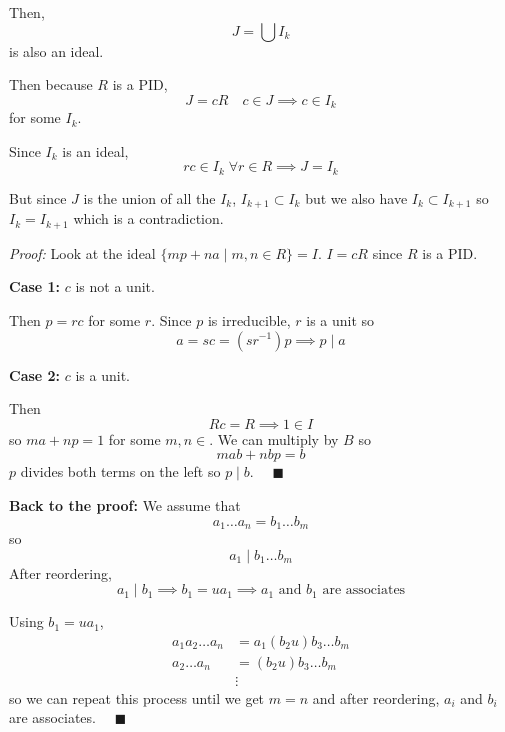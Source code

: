 \documentclass[12pt]{report}
\newcommand{\qed}{\quad \blacksquare}
\newenvironment*{tbox}[3][breakable]{
    \begin{tcolorbox}[
        parbox=false,
        colback=#2!5!white,
        colframe=#2!75!black,
        title={#3},
        #1
    ]}
    {\end{tcolorbox}}
\begin{document}
\begin{tbox}{gray}{\textbf{Theorem}: If a ring is a PID, it is a UFD}
            Then, 
            \[J = \bigcup I_k\] 
            is also an ideal. 
            
            Then because $R$ is a PID, 
            \[J = cR \quad c \in J \implies c \in I_k\]
            for some $I_k$. 
            
            Since $I_k$ is an ideal, 
            \[rc \in I_k \; \forall r \in R \implies J = I_k\]

            But since $J$ is the union of all the $I_k$, $I_{k+1} \subset I_k$ but we also have $I_k \subset I_{k+1}$ so $I_k = I_{k+1}$ which is a contradiction.

            
            \begin{tcolorbox}[colback=gray!5!white,colframe=gray!75!black,
                title={\emph{Lemma:} In a PID, if $p$ irreducible and $p \mid ab$, then $p \mid a$ or $p \mid b$}]

                \emph{Proof:} Look at the ideal $\{mp + na \; | \; m, n \in R\} = I$. $I = cR$ since $R$ is a PID. 

                \textbf{Case 1:} $c$ is not a unit. 
                
                Then $p = rc$ for some $r$. Since $p$ is irreducible, $r$ is a unit so 
                \[a = sc = (sr^{-1})p \implies p \mid a\]

                \textbf{Case 2:} $c$ is a unit. 

                Then 
                \[Rc = R \implies 1 \in I\] 
                so $ma + np = 1$ for some $m, n \in $. We can multiply by $B$ so 
                \[mab + nbp = b\]
                $p$ divides both terms on the left so $p \mid b$. $\qed$
            \end{tcolorbox}

            \textbf{Back to the proof:} We assume that 
            \[a_1 \dots a_n = b_1 \dots b_m\]
            so 
            \[a_1 \mid b_1 \dots b_m\]
            After reordering, 
            \[a_1 \mid b_1 \implies b_1 = ua_1 \implies a_1 \text{ and } b_1 \text{ are associates}\]

            Using $b_1 = ua_1$, 
            \begin{align*}
                a_1 a_2 \dots a_n &= a_1(b_2u) b_3 \dots b_m\\
                a_2 \dots a_n &= (b_2u)b_3 \dots b_m\\
                &\vdots
            \end{align*}
            so we can repeat this process until we get $m = n$ and after reordering, $a_i$ and $b_i$ are associates. $\qed$
    \end{tbox}
       
\end{document}
